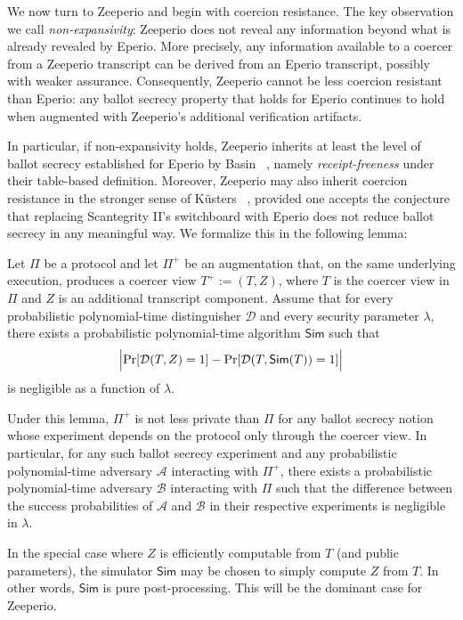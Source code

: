 
We now turn to Zeeperio and begin with coercion resistance. The key observation we call {\em non-expansivity}: Zeeperio does not reveal any information beyond what is already revealed by Eperio. More precisely, any information available to a coercer from a Zeeperio transcript can be derived from an Eperio transcript, possibly with weaker assurance. Consequently, Zeeperio cannot be less coercion resistant than Eperio: any ballot secrecy property that holds for Eperio continues to hold when augmented with Zeeperio’s additional verification artifacts. 

In particular, if non-expansivity holds, Zeeperio inherits at least the level of ballot secrecy established for Eperio by Basin \etal~\cite{BDGR21}, namely {\em receipt-freeness} under their table-based definition. Moreover, Zeeperio may also inherit coercion resistance in the stronger sense of K{\"u}sters \etal~\cite{KTV10c}, provided one accepts the conjecture that replacing Scantegrity II’s switchboard with Eperio does not reduce ballot secrecy in any meaningful way. We formalize this in the following lemma:

\begin{lemma}
Let $\Pi$ be a protocol and let $\Pi^{+}$ be an augmentation that, on the same underlying execution, produces a coercer view
$T^{+} := (T,Z)$, where $T$ is the coercer view in $\Pi$ and $Z$ is an additional transcript component.
Assume that for every probabilistic polynomial-time distinguisher $\mathcal{D}$ and every security parameter $\lambda$,
there exists a probabilistic polynomial-time algorithm $\mathsf{Sim}$ such that
\[
\Bigl|\Pr[\mathcal{D}(T,Z)=1] - \Pr[\mathcal{D}(T,\mathsf{Sim}(T))=1]\Bigr|
\]
is negligible as a function of $\lambda$.
\end{lemma}

Under this lemma, $\Pi^{+}$ is not less private than $\Pi$ for any ballot secrecy notion whose experiment depends on the protocol only through
the coercer view. In particular, for any such ballot secrecy experiment and any probabilistic polynomial-time adversary
$\mathcal{A}$ interacting with $\Pi^{+}$, there exists a probabilistic polynomial-time adversary
$\mathcal{B}$ interacting with $\Pi$ such that the difference between the success probabilities of
$\mathcal{A}$ and $\mathcal{B}$ in their respective experiments is negligible in $\lambda$.

 In the special case where $Z$ is efficiently computable from $T$ (and public parameters), the simulator
$\mathsf{Sim}$ may be chosen to simply compute $Z$ from $T$. In other words, $\mathsf{Sim}$ is pure post-processing. This will be the dominant case for Zeeperio.

